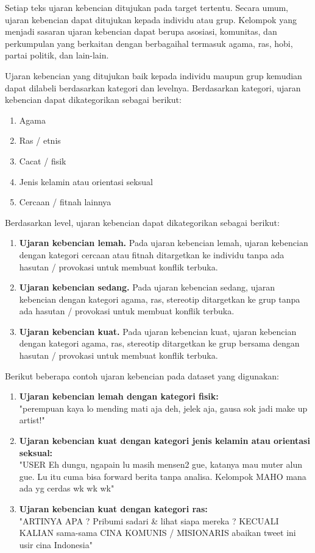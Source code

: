 	Setiap teks ujaran kebencian ditujukan pada target tertentu. Secara umum, ujaran kebencian dapat ditujukan kepada individu atau grup. Kelompok yang menjadi sasaran ujaran kebencian dapat berupa asosiasi, komunitas, dan perkumpulan yang berkaitan dengan berbagaihal termasuk agama, ras, hobi, partai politik, dan lain-lain.

	Ujaran kebencian yang ditujukan baik kepada individu maupun grup kemudian dapat dilabeli berdasarkan kategori dan levelnya. Berdasarkan kategori, ujaran kebencian dapat dikategorikan sebagai berikut:
	\begin{enumerate}
		\item Agama
		\item Ras / etnis
		\item Cacat / fisik
		\item Jenis kelamin atau orientasi seksual
		\item Cercaan / fitnah lainnya
	\end{enumerate}

	Berdasarkan level, ujaran kebencian dapat dikategorikan sebagai berikut:
	\begin{enumerate}
		\item \textbf{Ujaran kebencian lemah.} Pada ujaran kebencian lemah, ujaran kebencian dengan kategori cercaan atau fitnah ditargetkan ke individu tanpa ada hasutan / provokasi untuk membuat konflik terbuka.
		\item \textbf{Ujaran kebencian sedang.} Pada ujaran kebencian sedang, ujaran kebencian dengan kategori agama, ras, stereotip ditargetkan ke grup tanpa ada hasutan / provokasi untuk membuat konflik terbuka.
		\item \textbf{Ujaran kebencian kuat.} Pada ujaran kebencian kuat, ujaran kebencian dengan kategori agama, ras, stereotip ditargetkan ke grup bersama dengan hasutan / provokasi untuk membuat konflik terbuka.
	\end{enumerate}

	Berikut beberapa contoh ujaran kebencian pada dataset yang digunakan:
	
	\begin{enumerate}
		\item \textbf{Ujaran kebencian lemah dengan kategori fisik:} \\ 
		"perempuan kaya lo mending mati aja deh, jelek aja, gausa sok jadi make up artist!"

		\item \textbf{Ujaran kebencian kuat dengan kategori jenis kelamin atau orientasi seksual:} \\
		"USER Eh dungu, ngapain lu masih mensen2 gue, katanya mau muter alun gue. Lu itu cuma bisa forward berita tanpa analisa. Kelompok MAHO mana ada yg cerdas wk wk wk"

		\item \textbf{Ujaran kebencian kuat dengan kategori ras:} \\ 
		"ARTINYA APA ? Pribumi sadari \& lihat siapa mereka ? KECUALI KALIAN sama-sama CINA KOMUNIS / MISIONARIS abaikan tweet ini usir cina Indonesia"
	\end{enumerate}

